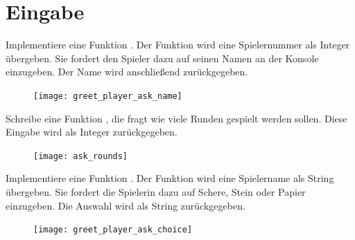 \documentclass[a4paper, DIV = calc]{scrartcl}
\begin{document}
\section{Eingabe}

\begin{aufgabe} \noindent 
Implementiere eine Funktion . Der Funktion wird eine Spielernummer als Integer übergeben. Sie fordert den Spieler dazu auf seinen Namen an der Konsole einzugeben. Der Name wird anschließend zurückgegeben.

\begin{figure}[H]
	\centering	
	\texttt{[image: greet\_player\_ask\_name]}

\end{figure}
\end{aufgabe}

\begin{aufgabe}
Schreibe eine Funktion , die fragt wie viele Runden gespielt werden sollen. Diese Eingabe wird als Integer zurückgegeben.

\begin{figure}[H]
	\centering	
	\texttt{[image: ask\_rounds]}

\end{figure}
\end{aufgabe}

\begin{aufgabe} \noindent 
Implementiere eine Funktion . Der Funktion wird eine Spielername als String übergeben. Sie fordert die Spielerin dazu auf Schere, Stein oder Papier einzugeben. Die Auswahl wird als String zurückgegeben.

\begin{figure}[H]
	\centering	
	\texttt{[image: greet\_player\_ask\_choice]}

\end{figure}
\end{aufgabe}
\end{document}
